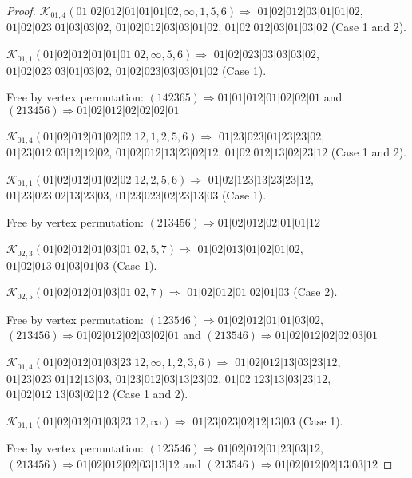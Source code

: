 \documentclass[12pt]{article}
\theoremstyle{plain}
\theoremstyle{definition}
\theoremstyle{remark}
\newcommand{\fancy}[1]{\mathcal{#1}}
\def\K{\fancy{K}}
\begin{document}
\begin{proof}
	$\K_{01,4}(01|02|012|01|01|01|02,\infty,1, 5, 6)\Rightarrow $ $01|02|012|03|01|01|02$, $01|02|023|01|03|03|02$, $01|02|012|03|03|01|02$, $01|02|012|03|01|03|02$ (Case 1 and 2).
	
	$\K_{01,1}(01|02|012|01|01|01|02,\infty,5, 6)\Rightarrow $ $01|02|023|03|03|03|02$, $01|02|023|03|01|03|02$, $01|02|023|03|03|01|02$ (Case 1).
	
	
	
	Free by vertex permutation: $(1 4 2 3 6 5)\Rightarrow 01|01|012|01|02|02|01$ and $(2 1 3 4 5 6)\Rightarrow 01|02|012|02|02|02|01$
	
	
	
	\bigskip
	
	$\K_{01,4}(01|02|012|01|02|02|12,1, 2, 5, 6)\Rightarrow $ $01|23|023|01|23|23|02$, $01|23|012|03|12|12|02$, $01|02|012|13|23|02|12$, $01|02|012|13|02|23|12$ (Case 1 and 2).
	
	$\K_{01,1}(01|02|012|01|02|02|12,2, 5, 6)\Rightarrow $ $01|02|123|13|23|23|12$, $01|23|023|02|13|23|03$, $01|23|023|02|23|13|03$ (Case 1).
	
	
	
	Free by vertex permutation: $(2 1 3 4 5 6)\Rightarrow 01|02|012|02|01|01|12$
	
	
	
	\bigskip
	
	$\K_{02,3}(01|02|012|01|03|01|02,5, 7)\Rightarrow $ $01|02|013|01|02|01|02$, $01|02|013|01|03|01|03$ (Case 1).
	
	$\K_{02,5}(01|02|012|01|03|01|02,7)\Rightarrow $ $01|02|012|01|02|01|03$ (Case 2).
	
	
	
	Free by vertex permutation: $(1 2 3 5 4 6)\Rightarrow 01|02|012|01|01|03|02$, $(2 1 3 4 5 6)\Rightarrow 01|02|012|02|03|02|01$ and $(2 1 3 5 4 6)\Rightarrow 01|02|012|02|02|03|01$
	
	
	
	\bigskip
	
	$\K_{01,4}(01|02|012|01|03|23|12,\infty,1, 2, 3, 6)\Rightarrow $ $01|02|012|13|03|23|12$, $01|23|023|01|12|13|03$, $01|23|012|03|13|23|02$, $01|02|123|13|03|23|12$, $01|02|012|13|03|02|12$ (Case 1 and 2).
	
	$\K_{01,1}(01|02|012|01|03|23|12,\infty)\Rightarrow $ $01|23|023|02|12|13|03$ (Case 1).
	
	
	
	Free by vertex permutation: $(1 2 3 5 4 6)\Rightarrow 01|02|012|01|23|03|12$, $(2 1 3 4 5 6)\Rightarrow 01|02|012|02|03|13|12$ and $(2 1 3 5 4 6)\Rightarrow 01|02|012|02|13|03|12$
	

\end{proof}
\end{document}

